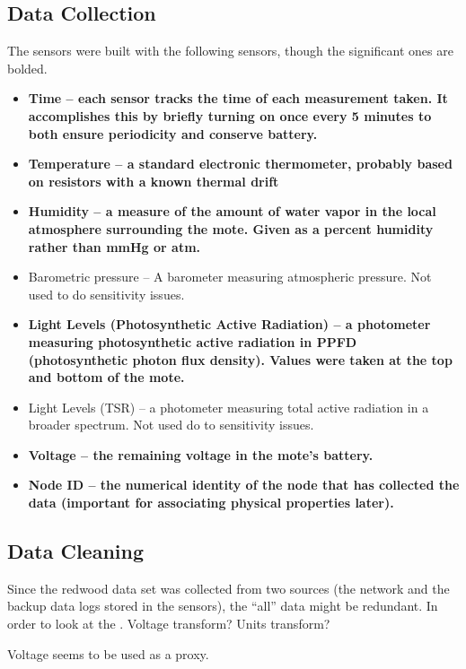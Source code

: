 \documentclass[english]{article}\usepackage[]{graphicx}\usepackage[]{color}
\begin{document}
\subsection{Data Collection}
The sensors were built with the following sensors, though the significant ones are bolded.
\begin{itemize}
\item \textbf{Time -- each sensor tracks the time of each measurement taken.  It accomplishes this by briefly turning on once every 5 minutes to both ensure periodicity and conserve battery.}
\item \textbf{Temperature -- a standard electronic thermometer, probably based on resistors with a known thermal drift}
\item \textbf{Humidity -- a measure of the amount of water vapor in the local atmosphere surrounding the mote.  Given as a percent humidity rather than mmHg or atm.}
\item Barometric pressure -- A barometer measuring atmospheric pressure.  Not used to do sensitivity issues.
\item \textbf{Light Levels (Photosynthetic Active Radiation) -- a photometer measuring photosynthetic active radiation in PPFD (photosynthetic photon flux density).  Values were taken at the top and bottom of the mote.}
\item Light Levels (TSR) -- a photometer measuring total active radiation in a broader spectrum.  Not used do to sensitivity issues.
\item \textbf{Voltage -- the remaining voltage in the mote's battery.}
\item \textbf{Node ID -- the numerical identity of the node that has collected the data (important for associating physical properties later).}
\end{itemize}

\subsection{Data Cleaning}

Since the redwood data set was collected from two sources (the network and the backup data logs stored in the sensors), the ``all'' data might be redundant.  In order to look at the .  Voltage transform?  Units transform?

Voltage seems to be used as a proxy.
\end{document}
